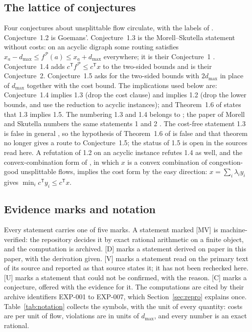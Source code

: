 \documentclass[11pt]{article}
\theoremstyle{remark}
\newcommand{\EXP}[1]{\mbox{EXP-#1}}
\newcommand{\dmax}{d_{\max}}
\newcommand{\flow}{f}
\begin{document}
\subsection{The lattice of conjectures}
\label{sec:lattice}

Four conjectures about unsplittable flow circulate, with the labels of \cite{STVZ25}. Conjecture~1.2 is Goemans'.
Conjecture~1.3 is the Morell--Skutella statement without costs: on an acyclic digraph some routing satisfies
$x_a-\dmax\le\flow^{\mathcal P}(a)\le x_a+\dmax$ everywhere; it is their Conjecture~1 \cite{MS22}. Conjecture~1.4 adds
$c^{\mathsf T}\flow^{\mathcal P}\le c^{\mathsf T}x$ to the two-sided bounds and is their Conjecture~2. Conjecture~1.5 asks for the
two-sided bounds with $2\dmax$ in place of $\dmax$ together with the cost bound. The implications used below are:
Conjecture~1.4 implies 1.3 (drop the cost clause) and implies 1.2 (drop the lower bounds, and use the reduction to acyclic
instances); and Theorem~1.6 of \cite{STVZ25} states that 1.3 implies 1.5. The numbering 1.3 and 1.4 belongs to \cite{STVZ25};
the paper of Morell and Skutella numbers the same statements 1 and 2 \cite{MS22}. The cost-free statement 1.3 is false in general
\cite{BLRT26}, so the hypothesis of Theorem~1.6 of \cite{STVZ25} is false and that theorem no longer gives a route to
Conjecture~1.5; the status of 1.5 is open in the sources read here. A refutation of 1.2 on an acyclic instance refutes 1.4
as well, and the convex-combination form of \cite{MSS07,MSW25}, in which $x$ is a convex combination of congestion-good
unsplittable flows, implies the cost form by the easy direction: $x=\sum_i\lambda_i y_i$ gives $\min_ic^{\mathsf T}y_i\le c^{\mathsf T}x$.

\subsection{Evidence marks and notation}
\label{sec:marks}

Every statement carries one of five marks. A statement marked [MV] is machine-verified: the repository decides it by exact
rational arithmetic on a finite object, and the computation is archived. [D] marks a statement derived on paper in this paper,
with the derivation given. [V] marks a statement read on the primary text of its source and reported as that source states
it; it has not been rechecked here. [U] marks a statement that could not be confirmed, with the reason. [C] marks a
conjecture, offered with the evidence for it. The computations are cited by their archive identifiers \EXP{001} to \EXP{007},
which Section~\ref{sec:repro} explains once. Table~\ref{tab:notation} collects the symbols, with the unit of every quantity: costs are per unit of flow, violations are in units of $\dmax$, and every number is an exact rational.
\end{document}
